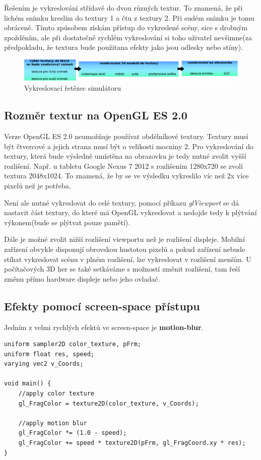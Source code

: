 \documentclass[11pt,twoside,a4paper]{book}
\begin{document}
Řešením je vykreslování střídavě do dvou různých textur. To znamená, že při lichém snímku kreslím do textury 1 a čtu z textury 2. Při sudém snímku je tomu obráceně. Tímto způsobem získám přístup do vykreslené scény, sice s drobným zpožděním, ale při dostatečně rychlém vykreslování si toho uživatel nevšimne(za předpokladu, že textura bude použita\linebreak na efekty jako jsou odlesky nebo stíny).

\begin{figure}[h!]
\includegraphics[width=150mm]{figures/render-schema.png}
\caption{Vykreslovací řetězec simulátoru}
\end{figure}

\subsection{Rozměr textur na OpenGL ES 2.0}
Verze OpenGL ES 2.0 neumožňuje používat obdélníkové textury. Textury musí být čtvercové a jejich strana musí být o velikosti mocniny 2.
Pro vykreslování do textury, která bude výsledně umístěna na obrazovku je tedy nutné zvolit vyšší rozlišení. Např. u tabletu Google Nexus 7 2012 s rozlišením 1280x720 se zvolí textura 2048x1024. To znamená, že by se ve výsledku vykreslilo víc než 2x více pixelů než je potřeba.

Není ale nutné vykreslovat do celé textury, pomocí příkazu \textit{glViewport} se dá nastavit část textury, do které má OpenGL vykreslovat a nedojde tedy k plýtvání výkonem(bude se plýtvat pouze pamětí).

Dále je možné zvolit nižší rozlišení viewportu než je rozlišení displeje. Mobilní zařízení obvykle disponují obrovskou hustotou pixelů a pokud zařízení nebude stíhat vykreslovat scénu v plném rozlišení, lze vykreslovat v rozlišení menším. U počítačových 3D her se také setkáváme s možností změnit rozlišení, tam řeší změnu přímo hardware displeje nebo jeho ovladač.

\subsection{Efekty pomocí screen-space přístupu}

Jedním z velmi rychlých efektů ve screen-space je \textbf{motion-blur}.
\lstset{language=GLSL} 
\begin{lstlisting}[caption=Motion blur fragment shader dle rychlosti vozidla]
uniform sampler2D color_texture, pFrm;
uniform float res, speed;
varying vec2 v_Coords;

void main() {
	//apply color texture
	gl_FragColor = texture2D(color_texture, v_Coords); 

	//apply motion blur
	gl_FragColor *= (1.0 - speed);
	gl_FragColor += speed * texture2D(pFrm, gl_FragCoord.xy * res);
}
\end{lstlisting}
\end{document}
